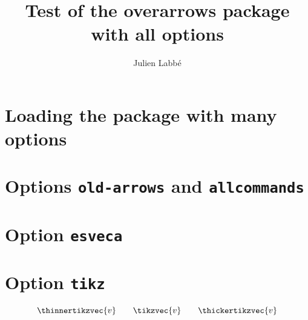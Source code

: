 \documentclass{article}
\title{Test of the \textsf{overarrows} package\\with all options}
\author{Julien Labb\'e}
\begin{document}
\maketitle

\section{Loading the package with many options}

\begin{dispListing}
\usepackage[%
  old-arrows, esvecth, esvecta,
  tikz, pstricks, pstarrows,
  subscripts, allcommands, debug
]{overarrows}
\end{dispListing}

\section{Options \texttt{old-arrows} and \texttt{allcommands}}

\begin{dispExample}
\TestOverArrow*{\overrightarrow}
\end{dispExample}

\begin{dispExample}
\TestOverArrow*{\amsvec}
\end{dispExample}

\section{Option \texttt{esveca}}

\begin{dispExample}
\TestOverArrow*{\esvec}
\end{dispExample}

\section{Option \texttt{tikz}}

\begin{dispExample}
\NewOverArrowCommand[tikz]{\tikzvec}{}
\TestOverArrow*{\tikzvec}
\end{dispExample}

\begin{dispExample}

$$ \thinnertikzvec{v} \qquad \tikzvec{v} \qquad \thickertikzvec{v} $$
\end{dispExample}
\end{document}
